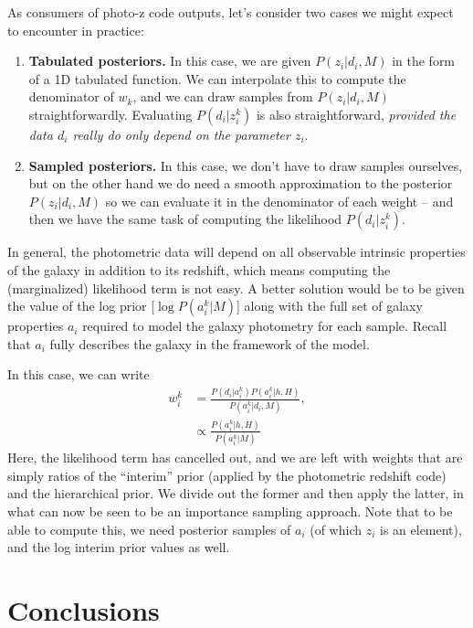 \documentclass[11pt]{amsart}
\begin{document}
As consumers of photo-z code outputs, let's consider two cases we might
expect to encounter in practice:
\begin{enumerate}
    \item {\bf Tabulated posteriors.} In this case, we are given
    $P(z_i|d_i,M)$ in the form of a 1D tabulated function. We can
    interpolate this to compute the denominator of $w_k$, and we can
    draw samples from $P(z_i|d_i,M)$ straightforwardly. Evaluating
    $P(d_i|z_i^k)$ is also straightforward, {\it provided the data $d_i$
    really do only depend on the parameter $z_i$}.

    \item {\bf Sampled posteriors.} In this case, we don't have to draw
    samples ourselves, but on the other hand we do need a smooth
    approximation to the posterior $P(z_i|d_i,M)$ so we can evaluate it
    in the denominator of each weight -- and then we have the same task
    of computing the likelihood $P(d_i|z_i^k)$.
\end{enumerate}

In general, the photometric data will depend on 
all observable intrinsic properties of the galaxy in addition to its redshift,
which means computing the
(marginalized) likelihood term is not easy. A better solution would be
to be given the value of the log prior 
[$\log P(a_i^k|M)$]
along 
with the full set of galaxy properties $a_i$ required to model the galaxy photometry for each sample. 
Recall that $a_i$ fully describes the galaxy in the framework of the model. 

In this case, we can write
\begin{align}
   w_i^k &= \frac{P(d_i|a_i^k) P(a_i^k|h,H)} {P(a_i^k|d_i,M)}, \\
         &\propto \frac{P(a_i^k|h,H)} {P(a_i^k|M)}
\end{align}
Here, the likelihood term has cancelled out, and we are left with
weights that are simply ratios of the ``interim'' prior (applied by the
photometric redshift code) and the hierarchical prior. We divide out the
former and then apply the latter, in what can now be seen to be an
importance sampling approach. Note that to be able to compute this, we
need posterior samples of $a_i$ (of which $z_i$ is an element), and the log interim
prior values as well.



\section{Conclusions}
\end{document}

